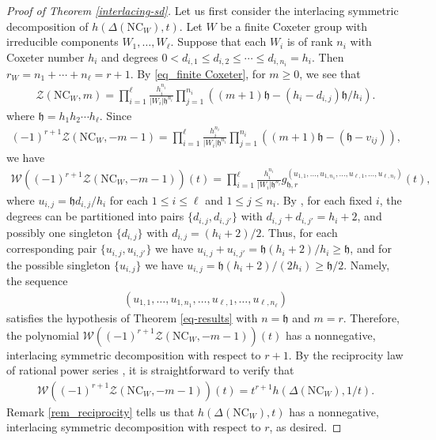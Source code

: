 \documentclass[12pt]{article}
\newcommand{\NC}{\mathrm{NC}}
\numberwithin{equation}{section}
\begin{document}
\begin{proof}[Proof of Theorem \ref{interlacing-sd}]
Let us first consider the interlacing symmetric decomposition of \(h(\Delta(\NC_W),t)\).
Let $W$ be a finite Coxeter group with irreducible components $W_1,\ldots,W_\ell$. 
Suppose that each $W_i$ is of rank $n_i$ with Coxeter number $h_i$ and degrees $0<d_{i,1}\le d_{i,2}\le \cdots \le d_{i,n_i}=h_i$. Then
\(r_W=n_1+\cdots+n_\ell=r+1\). By \eqref{eq_finite Coxeter}, for $m\ge 0$, we see that
\begin{align*}
\mathcal Z(\NC_W,m)=\prod_{i=1}^{\ell}\frac{h_i^{n_i}}{|W_i|\mathfrak{h}^{n_i}}\prod_{j=1}^{n_i}((m+1)\mathfrak{h}-(h_i-d_{i,j})\mathfrak{h}/h_i).
\end{align*}
where $\mathfrak{h}=h_1h_2\cdots h_{\ell}$. Since
\begin{align*}
(-1)^{r+1}\mathcal Z(\NC_W,-m-1)=\prod_{i=1}^{\ell}\frac{h_i^{n_i}}{|W_i|\mathfrak{h}^{n_i}}\prod_{j=1}^{n_i}((m+1)\mathfrak{h}-(\mathfrak{h}-v_{ij})),
\end{align*}
we have 
\begin{align*}
\mathcal{W}({(-1)^{r+1}\mathcal Z(\NC_W,-m-1)})(t)=\prod_{i=1}^{\ell}\frac{h_i^{n_i}}{|W_i|\mathfrak{h}^{n_i}}g^{(u_{1,1},\ldots,u_{1,n_1},\ldots,u_{\ell,1},\ldots,u_{\ell,n_{\ell}})}_{\mathfrak{h},r}(t),
\end{align*}
where $u_{i,j}=\mathfrak{h}d_{i,j}/h_i$ for each $1\leq i\leq \ell$ and $1\leq j\leq n_i$. By \cite[Figure~2.7]{Armstrong-2009}, for each fixed $i$, the degrees can be partitioned into pairs $\{d_{i,j},d_{i,j'}\}$ with $d_{i,j}+d_{i,j'}=h_i+2$, and possibly one singleton $\{d_{i,j}\}$ with $d_{i,j}=(h_i+2)/2$.
Thus, for each corresponding pair $\{u_{i,j},u_{i,j'}\}$ we have
$u_{i,j}+u_{i,j'}=\mathfrak{h}(h_i+2)/h_i\ge \mathfrak{h}$, and for the
possible singleton $\{u_{i,j}\}$ we have
$u_{i,j}=\mathfrak{h}(h_i+2)/(2h_i)\ge \mathfrak{h}/2$. Namely, the sequence 
\begin{align*}
(u_{1,1},\ldots,u_{1,n_1},\ldots,u_{\ell,1},\ldots,u_{\ell,n_{\ell}})    
\end{align*}
satisfies the hypothesis of Theorem \ref{eq-results} with $n=\mathfrak{h}$ and $m=r$. 
Therefore, the polynomial $\mathcal{W}({(-1)^{r+1}\mathcal Z(\NC_W,-m-1)})(t)$ has a nonnegative, interlacing symmetric decomposition with respect to $r+1$. By the reciprocity law of rational power series \cite[Lemma 3.15.11]{Stanley-2012}, it is straightforward
to verify that
\begin{align*}
\mathcal{W}({(-1)^{r+1}\mathcal Z(\NC_W,-m-1)})(t)=t^{r+1}h(\Delta(\NC_W),1/t).
\end{align*}
Remark \ref{rem_reciprocity} tells us that \(h(\Delta(\NC_W),t)\) has a nonnegative, interlacing symmetric decomposition with respect to $r$, as desired.


\end{proof}
\end{document}
